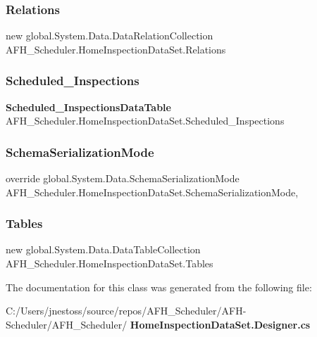 \subsubsection{Relations}
{\footnotesize\ttfamily new global.\+System.\+Data.\+Data\+Relation\+Collection A\+F\+H\+\_\+\+Scheduler.\+Home\+Inspection\+Data\+Set.\+Relations\hspace{0.3cm}{\ttfamily [get]}}

\mbox{\label{class_a_f_h___scheduler_1_1_home_inspection_data_set_afa9a91b66178eadc2066650740618038}} 
\subsubsection{Scheduled\_Inspections}
{\footnotesize\ttfamily \textbf{ Scheduled\+\_\+\+Inspections\+Data\+Table} A\+F\+H\+\_\+\+Scheduler.\+Home\+Inspection\+Data\+Set.\+Scheduled\+\_\+\+Inspections\hspace{0.3cm}{\ttfamily [get]}}

\mbox{\label{class_a_f_h___scheduler_1_1_home_inspection_data_set_a5cd31d4516a14a98b37bbe6ce3e0f480}} 
\subsubsection{SchemaSerializationMode}
{\footnotesize\ttfamily override global.\+System.\+Data.\+Schema\+Serialization\+Mode A\+F\+H\+\_\+\+Scheduler.\+Home\+Inspection\+Data\+Set.\+Schema\+Serialization\+Mode\hspace{0.3cm}{\ttfamily [get]}, {\ttfamily [set]}}

\mbox{\label{class_a_f_h___scheduler_1_1_home_inspection_data_set_a9e473e3c80dd98a68be25082891e93d4}} 
\subsubsection{Tables}
{\footnotesize\ttfamily new global.\+System.\+Data.\+Data\+Table\+Collection A\+F\+H\+\_\+\+Scheduler.\+Home\+Inspection\+Data\+Set.\+Tables\hspace{0.3cm}{\ttfamily [get]}}



The documentation for this class was generated from the following file\+:\begin{DoxyCompactItemize}
\item 
C\+:/\+Users/jnestoss/source/repos/\+A\+F\+H\+\_\+\+Scheduler/\+A\+F\+H-\/\+Scheduler/\+A\+F\+H\+\_\+\+Scheduler/\textbf{ Home\+Inspection\+Data\+Set.\+Designer.\+cs}\end{DoxyCompactItemize}
